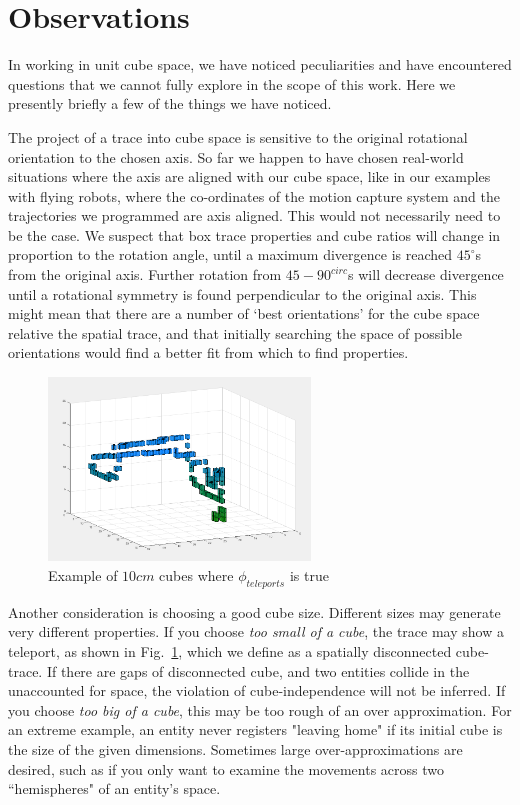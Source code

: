 \section{Observations}
\label{sec:observations}

In working in unit cube space, we have noticed peculiarities and have encountered questions that we cannot fully explore in the scope of this work.  
Here we presently briefly a few of the things we have noticed.

The project of a trace into cube space is sensitive to the original rotational orientation to the chosen axis.
So far we happen to have chosen real-world situations where the axis are aligned with our cube space, like in our examples with flying robots, where the co-ordinates of the motion capture system and the trajectories we programmed are axis aligned.
This would not necessarily need to be the case.
We suspect that box trace properties and cube ratios will change in proportion to the rotation angle, until a maximum divergence is reached $45^{\circ}$s from the original axis.
Further rotation from $45-90^{circ}$s will decrease divergence until a rotational symmetry is found perpendicular to the original axis.
This might mean that there are a number of `best orientations' for the cube space relative the spatial trace, and that initially searching the space of possible orientations would find a better fit from which to find properties.

\begin{figure}
  \centering
  \includegraphics[width=0.62\textwidth]{./figures/cubesTooSmall.png}
  \caption{Example of $10cm$ cubes where $\phi_{teleports}$ is true}
  \label{fig:teleport}
\end{figure}

Another consideration is choosing a good cube size.  
Different sizes may generate very different properties.
 If you choose \emph{too small of a cube}, the trace may show a teleport, as shown in Fig.~\ref{fig:teleport}, which we define as a spatially disconnected cube-trace.
If there are gaps of disconnected cube, and two entities collide in the unaccounted for space, the violation of cube-independence will not be inferred.
 If you choose \emph{too big of a cube}, this may be too rough of an over approximation.
For an extreme example, an entity never registers "leaving home" if its initial cube is the size of the given dimensions.
Sometimes large over-approximations are desired, such as if you only want to examine the movements across two ``hemispheres" of an entity's space.

